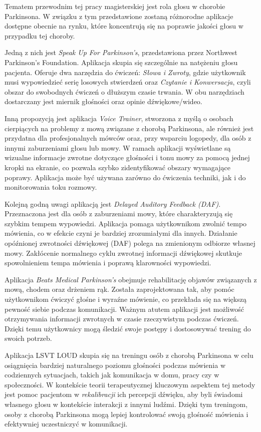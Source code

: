 Tematem przewodnim tej pracy magisterskiej jest rola głosu w chorobie Parkinsona.
W związku z tym przedstawione zostaną różnorodne aplikacje dostępne obecnie na rynku, które koncentrują się na poprawie jakości głosu w przypadku tej choroby.

Jedną z nich jest \emph{Speak Up For Parkinson's}, przedstawiona przez Northwest Parkinson's Foundation.
Aplikacja skupia się szczególnie na natężeniu głosu pacjenta.
Oferuje dwa narzędzia do ćwiczeń: \emph{Słowa i Zwroty}, gdzie użytkownik musi wypowiedzieć serię losowych stwierdzeń oraz \emph{Czytanie i Konwersacja}, czyli obszar do swobodnych ćwiczeń o dłuższym czasie trwania.
W obu narzędziach dostarczany jest miernik głośności oraz opinie dźwiękowe/wideo.

Inną propozycją jest aplikacja \emph{Voice Trainer}, stworzona z myślą o osobach cierpiących na problemy z mową związane z chorobą Parkinsona,
ale również jest przydatna dla profesjonalnych mówców oraz, przy wsparciu logopedy, dla osób z innymi zaburzeniami głosu lub mowy.
W ramach aplikacji wyświetlane są wizualne informacje zwrotne dotyczące głośności i tonu mowy za pomocą jednej kropki na ekranie, co pozwala szybko
zidentyfikować obszary wymagające poprawy.
Aplikacja może być używana zarówno do ćwiczenia techniki, jak i do monitorowania toku rozmowy.

Kolejną godną uwagi aplikacją jest \emph{Delayed Auditory Feedback (DAF)}.
Przeznaczona jest dla osób z zaburzeniami mowy, które charakteryzują się szybkim tempem wypowiedzi.
Aplikacja pomaga użytkownikom zwolnić tempo mówienia, co w efekcie czyni je bardziej zrozumiałymi dla innych.
Działanie opóźnionej zwrotności dźwiękowej (DAF) polega na zmienionym odbiorze własnej mowy.
Zakłócenie normalnego cyklu zwrotnej informacji dźwiękowej skutkuje spowolnieniem tempa mówienia i poprawą klarowności wypowiedzi.

Aplikacja \emph{Beats Medical Parkinson's} obejmuje rehabilitację objawów związanych z mową, chodem oraz drżeniem rąk.
Została zaprojektowana tak, aby pomóc użytkownikom ćwiczyć głośne i wyraźne mówienie, co przekłada się na większą pewność siebie podczas komunikacji.
Ważnym atutem aplikacji jest możliwość otrzymywania informacji zwrotnych w czasie rzeczywistym podczas ćwiczeń.
Dzięki temu użytkownicy mogą śledzić swoje postępy i dostosowywać trening do swoich potrzeb.

Aplikacja LSVT LOUD skupia się na treningu osób z chorobą Parkinsona w celu osiągnięcia bardziej naturalnego poziomu głośności podczas mówienia
w codziennych sytuacjach, takich jak komunikacja w domu, pracy czy w społeczności.
W kontekście teorii terapeutycznej kluczowym aspektem tej metody jest pomoc pacjentom w \emph{rekalibracji} ich percepcji dźwięku, aby byli świadomi
własnego głosu w kontekście interakcji z innymi ludźmi.
Dzięki tym treningom, osoby z chorobą Parkinsona mogą lepiej kontrolować swoją głośność mówienia i efektywniej uczestniczyć w komunikacji.

